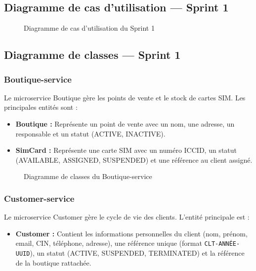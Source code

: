 \subsection{Diagramme de cas d'utilisation --- Sprint 1}

\begin{figure}[H]
    \centering
    \caption{Diagramme de cas d'utilisation du Sprint 1}
    \label{fig:uc_sprint1}
\end{figure}

\subsection{Diagramme de classes --- Sprint 1}

\subsubsection{Boutique-service}
Le microservice Boutique gère les points de vente et le stock de cartes SIM. Les principales entités sont :
\begin{itemize}
    \item \textbf{Boutique :} Représente un point de vente avec un nom, une adresse, un responsable et un statut (ACTIVE, INACTIVE).
    \item \textbf{SimCard :} Représente une carte SIM avec un numéro ICCID, un statut (AVAILABLE, ASSIGNED, SUSPENDED) et une référence au client assigné.
\end{itemize}

\begin{figure}[H]
    \centering
    \caption{Diagramme de classes du Boutique-service}
    \label{fig:class_boutique}
\end{figure}

\subsubsection{Customer-service}
Le microservice Customer gère le cycle de vie des clients. L'entité principale est :
\begin{itemize}
    \item \textbf{Customer :} Contient les informations personnelles du client (nom, prénom, email, CIN, téléphone, adresse), une référence unique (format \texttt{CLT-ANNÉE-UUID}), un statut (ACTIVE, SUSPENDED, TERMINATED) et la référence de la boutique rattachée.
\end{itemize}

